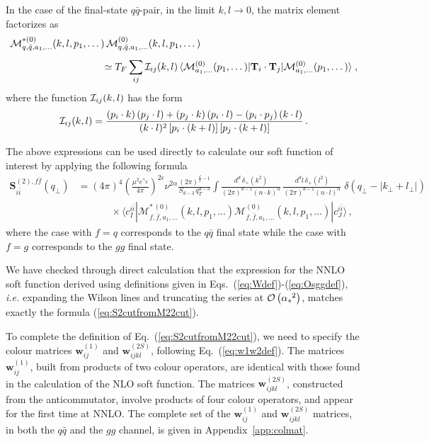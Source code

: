 \documentclass[a4paper,11pt]{article}
\newcommand{\as}{{\alpha_s}}
\newcommand{\bfS}{\bm{S}}
\newcommand{\ie}{{\it i.e. }}
\newcommand{\order}[1]{{{\cal O}\left(#1\right)}}
\def\cT{\bm{\mathrm{T}}}
\def\cm{\mathcal{M}}
\def\la{\langle}
\def\ra{\rangle}
\numberwithin{equation}{section}
\begin{document}
In the case of the final-state $q{\bar q}$-pair, in the limit $k, l \to 0$, the
matrix element factorizes as~\cite{Czakon:2014oma}
%
\begin{align}
  \label{qqsoftfac}
  \cm^{*(0)}_{q,{\bar q},a_1,\dots}(k,l,p_1,\dots)\,
  \cm^{(0)}_{q,{\bar q},a_1,\dots}(k,l,p_1,\dots) 
  &  
  \nonumber \\[0.5em]
  &
  \hspace{-100pt}
  \simeq
  T_F \sum_{ij} {\cal I}_{ij}(k,l) \,
  \la \cm^{(0)}_{a_1,\dots}(p_1,\dots)|\cT_i \cdot
  \cT_j|\cm^{(0)}_{a_1,\dots}(p_1,\dots)\ra\; ,
\end{align}
% 
where the function $ {\cal I}_{ij}(k,l)$ has the form
%
\begin{equation}
  \label{eq:Iij1}
  {\cal I}_{ij}(k,l) = \frac{(p_i \cdot k)\, (p_j \cdot l)
  + (p_j \cdot k)\, (p_i \cdot l) - (p_i \cdot p_j) 
  \,(k \cdot l)}{(k \cdot l)^2 
  \,[p_i\cdot (k+l)]\, [p_j \cdot (k+l)]} \,.
\end{equation}

The above expressions can be used directly to calculate our soft function of
interest by applying the following formula
%
\begin{align}
  \bfS_{i\bar i}^{(2), f\bar f} (q_\perp) & = 
   (4\pi)^4
  \left(\frac{\mu^2 e^{\gamma_E}}{4\pi}\right)^{2\epsilon}\!\!\!\!\nu^{2\alpha}
  \frac{(2\pi)^{\frac{d}{2}-1}}{ S_{d-3} \,q_T^{d-3}}
  \int 
  \frac{d^d\, \delta_+(k^2)}{(2\pi)^{d-1} (n\cdot k)^\alpha}\, \frac{d^d l\,
  \delta_+(l^2)}{(2\pi)^{d-1}(n\cdot l)^\alpha}\; 
    \delta(q_\perp- | k_\perp+l_\perp |)\,
  \nonumber \\
  &
  \hspace{40pt}
  \times
  \langle c_I^{i\bar i} | 
  \cm^{*\, (0)}_{f,\bar f,a_1,\dots}(k,l,p_1,\dots)
  \cm^{(0)}_{f,\bar f,a_1,\dots}(k,l,p_1,\dots)
  |c_J^{i\bar i} \rangle\,,
  \label{eq:S2cutfromM22cut}
\end{align}
%
where the case with $f=q$ corresponds to the $q\bar q$ final state while
the case with $f=g$ corresponds to the $gg$ final state.

We have checked through direct calculation that the expression for the NNLO soft
function  derived using definitions given in
Eqs.~(\ref{eq:Wdef})-(\ref{eq:Osggdef}), \ie expanding the Wilson lines and
truncating the series at $\order{\as^2}$, matches exactly the 
formula (\ref{eq:S2cutfromM22cut}).

To complete the definition of Eq.~(\ref{eq:S2cutfromM22cut}), we need to specify
the colour matrices $\bm{w}_{ij}^{(1)}$ and $\bm{w}_{ijkl}^{(2S)}$, following
Eq.~(\ref{eq:w1w2def}).  
%
The matrices $\bm{w}_{ij}^{(1)}$, built from products of two colour operators,
are identical with those found in the calculation of the NLO soft function.
%
The matrices $\bm{w}_{ijkl}^{(2S)}$, constructed from the anticommutator,
involve products of four colour operators, and appear for the first time at
NNLO.
%
The complete set of the $\bm{w}_{ij}^{(1)}$ and $\bm{w}_{ijkl}^{(2S)}$ matrices,
in both the $q\bar q$ and the $gg$ channel, is given in
Appendix~\ref{app:colmat}.
\end{document}
